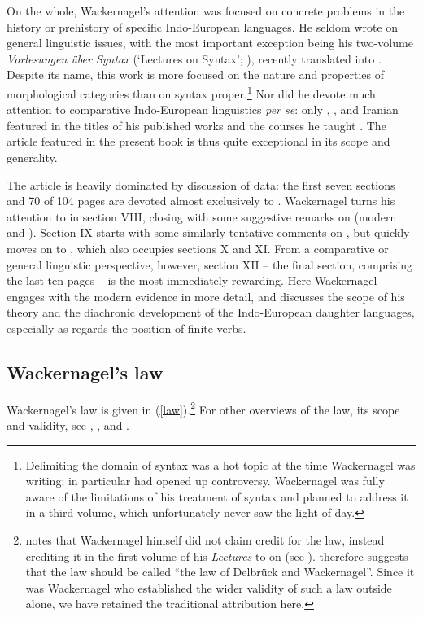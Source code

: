 \documentclass[output=paper]{../langscibook}
\begin{document}
On the whole, Wackernagel's attention was focused on concrete problems in the history or prehistory of specific Indo-European languages. He seldom wrote on general linguistic issues, with the most important exception being his two-volume \emph{Vorlesungen über Syntax} (`Lectures on Syntax'; \citeyear{Wackernagel1920,Wackernagel1924}), recently translated into  \citep{Langslow2009}. Despite its name, this work is more focused on the nature and properties of morphological categories than on syntax proper.\footnote{Delimiting the domain of syntax was a hot topic at the time Wackernagel was writing: \citet{Ries1894} in particular had opened up controversy. Wackernagel was fully aware of the limitations of his treatment of syntax and planned to address it in a third volume, which unfortunately never saw the light of day.}
Nor did he devote much attention to comparative Indo-European linguistics \emph{per se}: only , ,  and Iranian featured in the titles of his published works and the courses he taught \citep[xi]{Langslow2009}. The article featured in the present book \citep{Wackernagel1892} is thus quite exceptional in its scope and generality.

The article is heavily dominated by discussion of  data: the first seven sections and 70 of 104 pages are devoted almost exclusively to . Wackernagel turns his attention to  in section VIII, closing with some suggestive remarks on  (modern  and ). Section IX starts with some similarly tentative comments on , but quickly moves on to , which also occupies sections X and XI. From a comparative or general linguistic perspective, however, section XII -- the final section, comprising the last ten pages -- is the most immediately rewarding. Here Wackernagel engages with the modern  evidence in more detail, and discusses the scope of his theory and the diachronic development of the Indo-European daughter languages, especially as regards the position of finite verbs.

\subsection{Wackernagel's law}

Wackernagel's law is given in (\ref{law}).\footnote{\citet[218]{Collinge1985} notes that Wackernagel himself did not claim credit for the law, instead crediting it in the first volume of his \textit{Lectures} to \citet{Delbrueck1878} on  (see \citealp[57]{Langslow2009}). \citeauthor{Collinge1985} therefore suggests that the law should be called ``the law of Delbrück and Wackernagel''. Since it was Wackernagel who established the wider validity of such a law outside  alone, we have retained the traditional attribution here.} For other overviews of the law, its scope and validity, see \citet[218--219]{Collinge1985}, \citet{Krisch1990}, and \citet{Goldstein2014}.
\end{document}
